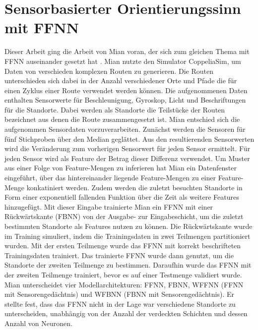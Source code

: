\section{Sensorbasierter Orientierungssinn mit FFNN}
Dieser Arbeit ging die Arbeit von Mian voran, der sich zum gleichen Thema mit FFNN auseinander gesetzt hat \cite{naveedThesis}.
Mian nutzte den Simulator CoppeliaSim, um Daten von verschieden komplexen Routen zu generieren.
Die Routen unterschieden sich dabei in der Anzahl verschiedener Orte und Pfade die für einen Zyklus einer Route verwendet werden können.
Die aufgenommenen Daten enthalten Sensorwerte für Beschleunigung, Gyroskop, Licht und Beschriftungen für die Standorte.
Dabei werden als Standorte die Teilstücke der Routen bezeichnet aus denen die Route zusammengesetzt ist.
\newline
\newline
Mian entschied sich die aufgenommen Sensordaten vorzuverarbeiten.
Zunächst werden die Sensoren für fünf Stichproben über den Median geglättet.
Aus den resultierenden Sensorwerten wird die Veränderung zum vorherigen Sensorwert für jeden Sensor ermittelt.
Für jeden Sensor wird als Feature der Betrag dieser Differenz verwendet.
Um Muster aus einer Folge von Feature-Mengen zu inferieren hat Mian ein Datenfenster eingeführt, über das
hintereinander liegende Feature-Mengen zu einer Feature-Menge konkatiniert werden.
Zudem werden die zuletzt besuchten Standorte in Form einer exponentiell fallenden Funktion über die Zeit als weitere Features hinzugefügt.
\newpage
Mit dieser Eingabe trainierte Mian ein FFNN mit einer Rückwärtskante (FBNN) von der Ausgabe- zur Eingabeschicht,
um die zuletzt bestimmten Standorte als Features nutzen zu können.
Die Rückwärtskante wurde im Training simuliert, indem die Trainingsdaten in zwei Teilmengen partitioniert wurden.
Mit der ersten Teilmenge wurde das FFNN mit korrekt beschrifteten Trainingsdaten trainiert.
Das trainierte FFNN wurde dann genutzt, um die Standorte der zweiten Teilmenge zu bestimmen.
Daraufhin wurde das FFNN mit der zweiten Teilmenge trainiert, bevor es auf einer Testmenge validiert wurde.
\newline
\newline
Mian unterscheidet vier Modellarchitekturen: FFNN, FBNN, WFFNN (FFNN mit Sensorengedächtnis) und WFBNN (FBNN mit Sensorengedächtnis).
Er stellte fest, dass das FFNN nicht in der Lage war verschiedene Standorte zu unterscheiden,
unabhängig von der Anzahl der verdeckten Schichten und dessen Anzahl von Neuronen.
\newline
